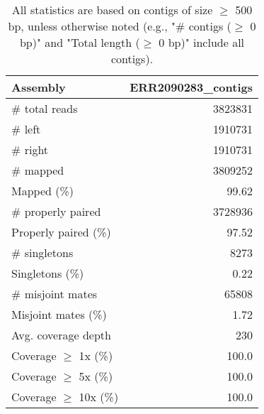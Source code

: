 \documentclass[12pt,a4paper]{article}
\begin{document}
\begin{table}[ht]
\begin{center}
\caption{All statistics are based on contigs of size $\geq$ 500 bp, unless otherwise noted (e.g., "\# contigs ($\geq$ 0 bp)" and "Total length ($\geq$ 0 bp)" include all contigs).}
\begin{tabular}{|l*{1}{|r}|}
\hline
Assembly & ERR2090283\_contigs \\ \hline
\# total reads & 3823831 \\ \hline
\# left & 1910731 \\ \hline
\# right & 1910731 \\ \hline
\# mapped & 3809252 \\ \hline
Mapped (\%) & 99.62 \\ \hline
\# properly paired & 3728936 \\ \hline
Properly paired (\%) & 97.52 \\ \hline
\# singletons & 8273 \\ \hline
Singletons (\%) & 0.22 \\ \hline
\# misjoint mates & 65808 \\ \hline
Misjoint mates (\%) & 1.72 \\ \hline
Avg. coverage depth & 230 \\ \hline
Coverage $\geq$ 1x (\%) & 100.0 \\ \hline
Coverage $\geq$ 5x (\%) & 100.0 \\ \hline
Coverage $\geq$ 10x (\%) & 100.0 \\ \hline
\end{tabular}
\end{center}
\end{table}
\end{document}

